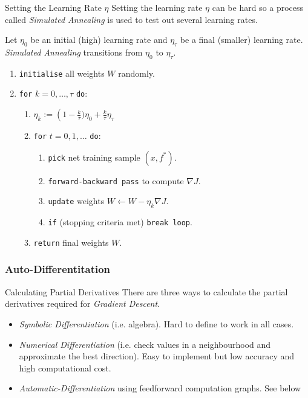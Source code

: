 \documentclass[11pt,a4paper]{article}
\begin{document}
\begin{proposition}{Setting the Learning Rate $\eta$}
  Setting the learning rate $\eta$ can be hard so a process called \textit{Simulated Annealing} is used to test out several learning rates.
  \par Let $\eta_0$ be an initial (high) learning rate and $\eta_\tau$ be a final (smaller) learning rate. \textit{Simulated Annealing} transitions from $\eta_0$ to $\eta_\tau$.
  \begin{enumerate}
    \item \texttt{initialise} all weights $W$ randomly.
    \item \texttt{for} $k=0,\dots,\tau$ \texttt{do}:
    \begin{enumerate}
      \item $\eta_k:=\left(1-\frac{k}\tau)\eta_0+\frac{k}\tau\eta_\tau$
      \item \texttt{for} $t=0,1,\dots$ \texttt{do}:
      \begin{enumerate}
        \item \texttt{pick} net training sample $(x,f^*)$.
        \item \texttt{forward-backward pass} to compute $\nabla J$.
        \item \texttt{update} weights $W\leftarrow W-\eta_k\nabla J$.
        \item \texttt{if} (stopping criteria met) \texttt{break loop}.
      \end{enumerate}
      \item \texttt{return} final weights $W$.
    \end{enumerate}
  \end{enumerate}
\end{proposition}


\subsubsection{Auto-Differentitation}

\begin{proposition}{Calculating Partial Derivatives}
  There are three ways to calculate the partial derivatives required for \textit{Gradient Descent}.
  \begin{itemize}
    \item \textit{Symbolic Differentiation} (i.e. algebra). Hard to define to work in all cases.
    \item \textit{Numerical Differentiation} (i.e. check values in a neighbourhood and approximate the best direction). Easy to implement but low accuracy and high computational cost.
    \item \textit{Automatic-Differentiation} using feedforward computation graphs. See below
  \end{itemize}
\end{proposition}
\end{document}
